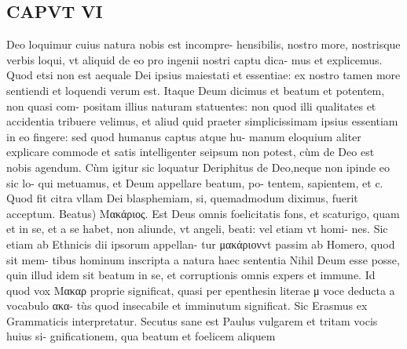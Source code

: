 \documentclass{article}
\begin{document}
\begin{pages}
\section*{CAPVT VI }
\marginpar{[ p.481 ]}\pstart Deo loquimur cuius natura nobis est incompre- hensibilis, nostro more, nostrisque verbis loqui, vt aliquid de eo pro ingenii nostri captu dica- mus et explicemus. Quod etsi non est aequale Dei ipsius maiestati et essentiae: ex nostro tamen more sentiendi et loquendi verum est. Itaque  Deum dicimus et beatum et potentem, non quasi com- positam illius naturam statuentes: non quod illi qualitates et accidentia tribuere velimus, et aliud quid praeter simplicissimam ipsius essentiam in eo fingere: sed quod humanus captus atque hu- manum eloquium aliter explicare commode et satis intelligenter seipsum non potest, cùm de Deo est nobis agendum. Cùm igitur sic loquatur Deriphitus de Deo,neque non ipinde eo sic lo- qui metuamus, et Deum appellare beatum, po- tentem, sapientem, et c. Quod fit citra vllam Dei blasphemiam, si, quemadmodum diximus, fuerit acceptum.  \pend\pstart Beatus) Μακάριος. Est Deus omnis foelicitatis fons, et scaturigo, quam et in se, et a se habet, non aliunde, vt angeli, beati: vel etiam vt homi- nes. Sic etiam ab Ethnicis dii ipsorum appellan- tur μακάριονvt passim ab Homero, quod sit mem- tibus hominum inscripta a natura haec sententia Nihil Deum esse posse, quin illud idem sit beatum in se, et corruptionis omnis expers et immune. Id quod vox Μακαρ proprie significat, quasi per epenthesin literae μ voce deducta a vocabulo ακα- tùs quod insecabile et imminutum significat. Sic Erasmus ex Grammaticis interpretatur. Secutus sane est Paulus vulgarem et tritam vocis huius si- gnificationem, qua beatum et foelicem aliquem  \pend

\end{pages}
\end{document}
